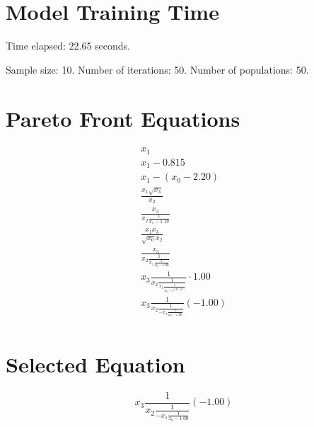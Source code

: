 \documentclass{article}
\begin{document}
\section*{Model Training Time}
Time elapsed: 22.65 seconds.

Sample size: 10.
Number of iterations: 50.
Number of populations: 50.

\section*{Pareto Front Equations}
\begin{align*}
x_{1} \\
x_{1} - 0.815 \\
x_{1} - \left(x_{0} - 2.20\right) \\
\frac{x_{1} \sqrt{x_{3}}}{x_{2}} \\
\frac{x_{3}}{x_{2} \frac{1}{x_{1} - 1.19}} \\
\frac{x_{1} x_{3}}{\sqrt{x_{0}} x_{2}} \\
\frac{x_{3}}{x_{2} \frac{1}{x_{1} \frac{1}{x_{0} - 1.00}}} \\
x_{3} \frac{1}{x_{2} \frac{1}{x_{1} \frac{1}{x_{0} - e^{4.32 \cdot 10^{-5}}}}} \cdot 1.00 \\
x_{3} \frac{1}{x_{2} \frac{1}{- x_{1} \frac{1}{x_{0} - 1.00}}} \left(-1.00\right) \\
\end{align*}

\section*{Selected Equation}
\[ x_{3} \frac{1}{x_{2} \frac{1}{- x_{1} \frac{1}{x_{0} - 1.00}}} \left(-1.00\right) \]
\end{document}
